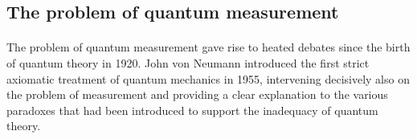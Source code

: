 \documentclass[a4paper,10pt]{article}
\newcommand{\from}[2]{{\bf[{\sc from #1:} #2]}}
\begin{document}






\subsection{The problem of quantum measurement}

\paragraph{} The problem of quantum measurement gave rise to heated debates since the birth of quantum theory in 1920. John von Neumann introduced the first strict axiomatic treatment of quantum mechanics in 1955, intervening decisively also on the problem of measurement and providing a clear explanation to the various paradoxes that had been introduced to support the inadequacy of quantum theory.
\end{document}
